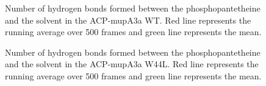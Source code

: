 \begin{singlespacing}
		\setlength\fboxsep{5pt}
		\setlength\fboxrule{1.5pt}
		\begin{figure}[htbp]
		\centering
		\caption[Number of hydrogen bonds formed between the phosphopantetheine and the solvent in the ACP-mupA3a WT.]{Number of hydrogen bonds formed between the phosphopantetheine and the solvent in the ACP-mupA3a WT.  Red line represents the running average over 500 frames and green line represents the mean.}
		\label{fig:HbondACPPPTWild_solvent}
		\end{figure}	
		
		\setlength\fboxsep{5pt}
		\setlength\fboxrule{1.5pt}
		\begin{figure}[htbp]
		\centering
		\caption[Number of hydrogen bonds formed between the phosphopantetheine and the solvent in the ACP-mupA3a W44L.]{Number of hydrogen bonds formed between the phosphopantetheine and the solvent in the ACP-mupA3a W44L.  Red line represents the running average over 500 frames and green line represents the mean.}
		\label{fig:HbondACPPPTMutant_solvent}
		\end{figure}	



\end{singlespacing}
